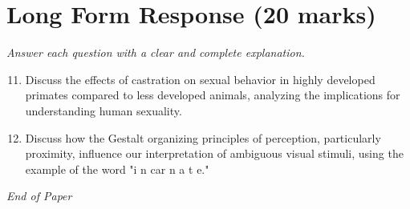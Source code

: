 \documentclass[12pt]{article}
\begin{document}
\section*{Long Form Response (20 marks)}
\textit{Answer each question with a clear and complete explanation.}
\begin{enumerate}[label=\arabic*.]
\setcounter{enumi}{10}
\item Discuss the effects of castration on sexual behavior in highly developed primates compared to less developed animals, analyzing the implications for understanding human sexuality.
\item Discuss how the Gestalt organizing principles of perception, particularly proximity, influence our interpretation of ambiguous visual stimuli, using the example of the word "i n car n a t e."
\end{enumerate}

\vfill
\noindent\textit{End of Paper}
\end{document}
